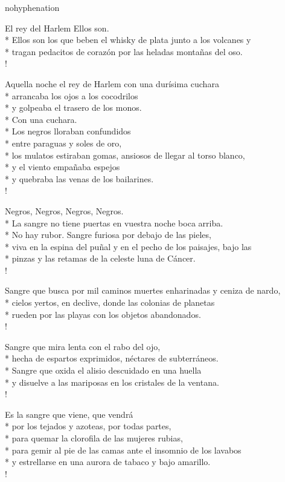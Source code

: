 \documentclass[
    a5paper,
    DIV=10,
    12pt,
    notitlepage,
    oneside,]
{scrbook} %
\begin{document}
\begin{hyphenrules}{nohyphenation}
\begin{poem}{El rey del Harlem}{}{\vspace{-1em}}
Ellos son.\\*
Ellos son los que beben el whisky de plata junto a los volcanes y\\*
tragan pedacitos de corazón por las heladas montañas del oso.\\!

Aquella noche el rey de Harlem con una durísima cuchara\\*
arrancaba los ojos a los cocodrilos\\*
y golpeaba el trasero de los monos.\\*
Con una cuchara.\\*
Los negros lloraban confundidos\\*
entre paraguas y soles de oro,\\*
los mulatos estiraban gomas, ansiosos de llegar al torso blanco,\\*
y el viento empañaba espejos\\*
y quebraba las venas de los bailarines.\\!

Negros, Negros, Negros, Negros.\\*
La sangre no tiene puertas en vuestra noche boca arriba.\\*
No hay rubor. Sangre furiosa por debajo de las pieles,\\*
viva en la espina del puñal y en el pecho de los paisajes, bajo las\\*
pinzas y las retamas de la celeste luna de Cáncer.\\!

Sangre que busca por mil caminos muertes enharinadas y ceniza de nardo,\\*
cielos yertos, en declive, donde las colonias de planetas\\*
rueden por las playas con los objetos abandonados.\\!

Sangre que mira lenta con el rabo del ojo,\\*
hecha de espartos exprimidos, néctares de subterráneos.\\*
Sangre que oxida el alisio descuidado en una huella\\*
y disuelve a las mariposas en los cristales de la ventana.\\!

Es la sangre que viene, que vendrá\\*
por los tejados y azoteas, por todas partes,\\*
para quemar la clorofila de las mujeres rubias,\\*
para gemir al pie de las camas ante el insomnio de los lavabos\\*
y estrellarse en una aurora de tabaco y bajo amarillo.\\!


\end{poem}
\end{hyphenrules}
\end{document}
